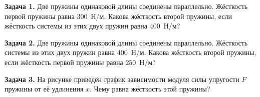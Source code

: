 
\begin{taskbasic}[code={\label{task:elastic_v1_n22}}]
\textbf{Задача 1.} Две пружины одинаковой длины соединены параллельно. Жёсткость первой пружины равна $300$~Н/м. Какова жёсткость второй пружины, если жёсткость системы из этих двух пружин равна $400$~Н/м?

\end{taskbasic}

\begin{taskbasic}[code={\label{task:elastic_v2_n22}}]
\textbf{Задача 2.} Две пружины одинаковой длины соединены параллельно. Жёсткость системы из этих двух пружин равна $400$~Н/м. Какова жёсткость второй пружины, если жёсткость первой пружины равна $250$~Н/м?

\end{taskbasic}

\begin{taskbasic}[code={\label{task:elastic_v5_n2}}]
\textbf{Задача 3.} На рисунке приведён график зависимости модуля силы упругости $F$ пружины от её удлинения $x$. Чему равна жёсткость этой пружины?

\nopagebreak\smallskip
\begin{center}
\end{center}

\end{taskbasic}

